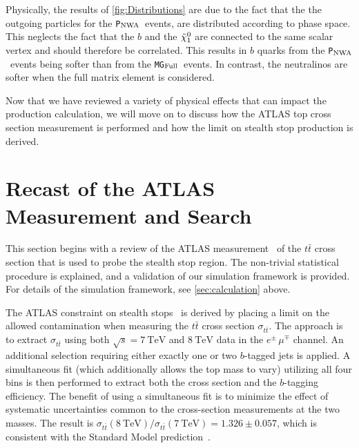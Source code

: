 \documentclass[a4paper,12pt]{article}
\newcommand{\tev}{~\text{TeV}}
\newcommand{\pythia}{\texttt{P}$_{\rm{NWA}}$}
\newcommand{\mg}{\texttt{MG}$_{\rm{Full}}$}
\def\ninoone{\ensuremath{\mathchoice%
      {\displaystyle\raise.4ex\hbox{$\displaystyle\tilde\chi^0_1$}}%
         {\textstyle\raise.1ex\hbox{$\textstyle\tilde\chi^0_1$}}%
       {\scriptstyle\raise.3ex\hbox{$\scriptstyle\tilde\chi^0_1$}}%
 {\scriptscriptstyle\raise.3ex\hbox{$\scriptscriptstyle\tilde\chi^0_1$}}}}
\begin{document}
Physically, the results of \cref{fig:Distributions} are due to the fact that the the outgoing particles for the \pythia\ events, are distributed according to phase space.  This neglects the fact that the $b$ and the $\ninoone$ are connected to the same scalar vertex and should therefore be correlated.  This results in $b$ quarks from the \pythia\ events being softer than from the \mg\ events. In contrast, the neutralinos are softer when the full matrix element is considered.

Now that we have reviewed a variety of physical effects that can impact the production calculation, we will move on to discuss how the ATLAS top cross section measurement is performed and how the limit on stealth stop production is derived.


\section{Recast of the ATLAS Measurement and Search}
\label{sec:search}
This section begins with a review of the ATLAS measurement~\cite{TOPQ-2013-04} of the $t\bar{t}$ cross section that is used to probe the stealth stop region.  The non-trivial statistical procedure is explained, and a validation of our simulation framework is provided.  For details of the simulation framework, see \cref{sec:calculation} above.  

The ATLAS constraint on stealth stops~\cite{TOPQ-2013-04} is derived by placing a limit on the allowed contamination when measuring the $t\bar{t}$ cross section $\sigma_{t\bar{t}}$.  The approach is to extract $\sigma_{t\bar{t}}$ using both $\sqrt{s}=7 \tev$ and $8 \tev$ data in the $e^\pm\,\mu^\mp$ channel. An additional selection requiring either exactly one or two $b$-tagged jets is applied.  A simultaneous fit (which additionally allows the top mass to vary) utilizing all four bins is then performed to extract both the cross section and the $b$-tagging efficiency.  
The benefit of using a simultaneous fit is to minimize the effect of systematic uncertainties common to the cross-section measurements at the two masses. The result is $\sigma_{t\bar{t}}(8\tev) / \sigma_{t\bar{t}}(7\tev) = 1.326 \pm 0.057$, which is consistent with the Standard Model prediction~\cite{TOPQ-2013-04, Beneke:2011mq,Cacciari:2011hy,Czakon:2012zr,Czakon:2012pz,Czakon:2013goa,Czakon:2011xx}.
\end{document}
